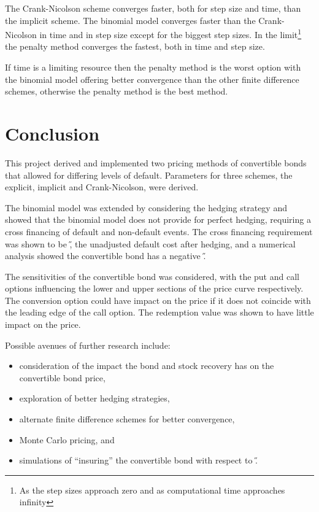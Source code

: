 \documentclass[a4paper,11pt,oneside]{report}
\theoremstyle{plain}
\theoremstyle{definition}
\begin{document}
The Crank-Nicolson scheme converges faster, both for step size and time, than the implicit scheme.  The binomial model converges faster than the Crank-Nicolson in time and in step size except for the biggest step sizes.  In the limit\footnote{As the step sizes approach zero and as computational time approaches infinity} the penalty method converges the fastest, both in time and step size.

If time is a limiting resource then the penalty method is the worst option with the binomial model offering better convergence than the other finite difference schemes, otherwise the penalty method is the best method.


\chapter{Conclusion}
This project derived and implemented two pricing methods of convertible bonds that allowed for differing levels of default.  Parameters for three schemes, the explicit, implicit and Crank-Nicolson, were derived.

The binomial model was extended by considering the hedging strategy and showed that the binomial model does not provide for perfect hedging, requiring a cross financing of default and non-default events.  The cross financing requirement was shown to be \H, the unadjusted default cost after hedging, and a numerical analysis showed the convertible bond has a negative \H.

The sensitivities of the convertible bond was considered, with the put and call options influencing the lower and upper sections of the price curve respectively.  The conversion option could have impact on the price if it does not coincide with the leading edge of the call option.  The redemption value was shown to have little impact on the price.

Possible avenues of further research include:
\begin{itemize}
 \item consideration of the impact the bond and stock recovery has on the convertible bond price,
 \item exploration of better hedging strategies,
 \item alternate finite difference schemes for better convergence,
 \item Monte Carlo pricing, and
 \item simulations of ``insuring'' the convertible bond with respect to \H.
\end{itemize}
\end{document}
